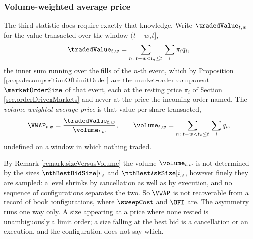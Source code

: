 \subsubsection{Volume-weighted average price}

The third statistic does require exactly that knowledge.
Write $\tradedValue_{t,w}$ for the value transacted over the window $(t-w,t]$,
\begin{equation}
\label{eq.tradedValue}
\tradedValue_{t,w} = \sum_{n \, : \, t-w < t_n \leq t} \, \sum_i \pi_i q_i ,
\end{equation}
the inner sum running over the fills of the $n$-th event,
which by Proposition \ref{prop.decompositionOfLimitOrder}
are the market-order component $\marketOrderSize$ of that event,
each at the resting price $\pi_i$ of Section \ref{sec.orderDrivenMarkets}
and never at the price the incoming order named.
The \emph{volume-weighted average price} is that value per share transacted,
\begin{equation}
\label{eq.vwap}
\VWAP_{t,w} = \frac{\tradedValue_{t,w}}{\volume_{t,w}},
\qquad
\volume_{t,w} = \sum_{n \, : \, t-w < t_n \leq t} \, \sum_i q_i ,
\end{equation}
undefined on a window in which nothing traded.

By Remark \ref{remark.sizeVersusVolume} the volume $\volume_{t,w}$ is not determined by
the sizes $\nthBestBidSize[i]_t$ and $\nthBestAskSize[i]_t$,
however finely they are sampled:
a level shrinks by cancellation as well as by execution,
and no sequence of configurations separates the two.
So $\VWAP$ is not recoverable from a record of book configurations,
where $\sweepCost$ and $\OFI$ are.
The asymmetry runs one way only.
A size appearing at a price where none rested is unambiguously a limit order;
a size falling at the best bid is a cancellation or an execution,
and the configuration does not say which.
